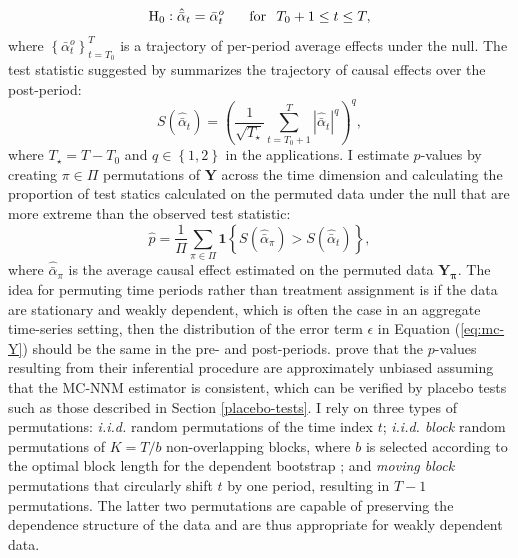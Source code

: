 \documentclass[12pt]{article}
\begin{document}
\begin{equation}
\text{H}_0: \hat{\bar{\alpha}}_{t} = \bar{\alpha}^{o}_{t} \, \hspace{5mm} \,  \text{for} \, \hspace{2mm} T_0+1 \leq t \leq T,
\end{equation}
%
where $\left\{\bar{\alpha}^{o}_{t}\right\}_{t=T_0}^T$ is a trajectory of per-period average effects under the null. The test statistic suggested by \citet{chernozhukov2017exact} summarizes the trajectory of causal effects over the post-period:
%
\begin{equation} \label{tstat}
S (\hat{\bar{\alpha}}_{t}) = \left(\frac{1}{\sqrt{T_\star}} \sum_{t=T_0 +1}^{T} |\hat{\bar{\alpha}}_{t}|^q\right)^q,
\end{equation}
%
where $T_\star = T-T_0$ and $q \in \left\{1, 2\right\}$ in the applications. I estimate $p$-values by creating $\pi \in \Pi$ permutations of $\mathbf{Y}$ across the time dimension and calculating the proportion of test statics calculated on the permuted data under the null that are more extreme than the observed test statistic:
%
\begin{equation}
\hat{p} = \frac{1}{\Pi} \sum_{\pi \in \Pi} \textbf{1} \left\{S (\hat{\bar{\alpha}}_{\pi}) > S (\hat{\bar{\alpha}}_{t}) \right\}, \label{eq:pvalue}
\end{equation}
%
where $\hat{\bar{\alpha}}_{\pi}$ is the average causal effect estimated on the permuted data $\mathbf{Y_\pi}$. The idea for permuting time periods rather than treatment assignment is if the data are stationary and weakly dependent, which is often the case in an aggregate time-series setting, then the distribution of the error term $\epsilon$ in Equation (\ref{eq:mc-Y}) should be the same in the pre- and post-periods. \citet{chernozhukov2017exact} prove that the $p$-values resulting from their inferential procedure are approximately unbiased assuming that the MC-NNM estimator is consistent, which can be verified by placebo tests such as those described in Section \ref{placebo-tests}. I rely on three types of permutations: \emph{i.i.d.} random permutations of the time index $t$; \emph{i.i.d. block} random permutations of $K=T/b$ non-overlapping blocks, where $b$ is selected according to the optimal block length for the dependent bootstrap \citep{politis2004automatic}; and \emph{moving block} permutations that circularly shift $t$ by one period, resulting in $T-1$ permutations. The latter two permutations are capable of preserving the dependence structure of the data and are thus appropriate for weakly dependent data. 
\end{document}
